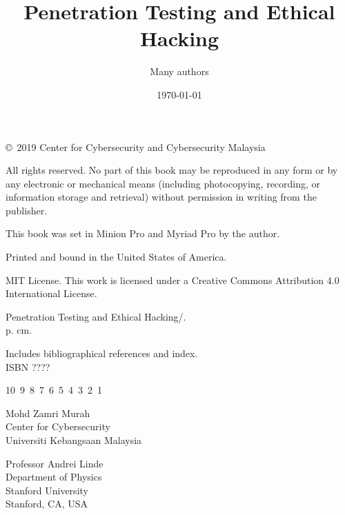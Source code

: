 \documentclass[7x9]{times}
\title{Penetration Testing and Ethical Hacking}
\author{Many authors}
\date{\today}
\begin{document}

\titlepage

\begin{copyrightpage}

  \copyright\ 2019 Center for Cybersecurity and Cybersecurity Malaysia
	
	All rights reserved. No part of this book may be reproduced in
        any form or by any electronic or mechanical means (including
        photocopying, recording, or information storage and retrieval)
        without permission in writing from the publisher.
	
	
	This book was set in Minion Pro and Myriad Pro by the author.
	
	Printed and bound in the United States of America.
	
	MIT License. This work is licensed under a Creative Commons Attribution 
	4.0 International License.
	
	Penetration Testing and Ethical Hacking/.\\
	\hspace*{6pt} p. cm.
	
	Includes bibliographical references and index.\\ ISBN ????
        \vfill
	
	10\ 9\ 8\ 7\ 6\ 5\ 4\ 3\ 2\ 1\
	
\end{copyrightpage}

\tableofcontents
\listoffigures
\listoftables

\begin{contributors}[twocolumn]
	
	\contrib 
	Mohd Zamri Murah\\
	Center for Cybersecurity\\
	Universiti Kebangsaan Malaysia
	
	\contrib 
	Professor Andrei Linde\\
	Department of Physics\\
	Stanford University\\
	Stanford, CA, USA
\end{contributors}
\end{document}
